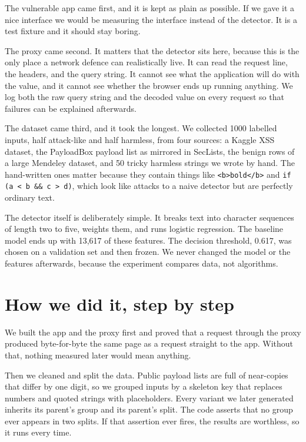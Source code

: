 \documentclass[11pt,a4paper]{article}
\newcommand{\tc}[1]{\texttt{\small #1}}
\begin{document}
The vulnerable app came first, and it is kept as plain as possible. If we gave it a nice
interface we would be measuring the interface instead of the detector. It is a test fixture
and it should stay boring.

The proxy came second. It matters that the detector sits here, because this is the only
place a network defence can realistically live. It can read the request line, the headers,
and the query string. It cannot see what the application will do with the value, and it
cannot see whether the browser ends up running anything. We log both the raw query string
and the decoded value on every request so that failures can be explained afterwards.

The dataset came third, and it took the longest. We collected 1000 labelled inputs, half
attack-like and half harmless, from four sources: a Kaggle XSS dataset, the PayloadBox
payload list as mirrored in SecLists, the benign rows of a large Mendeley dataset, and 50
tricky harmless strings we wrote by hand. The hand-written ones matter because they contain
things like \tc{<b>bold</b>} and \tc{if (a < b \&\& c > d)}, which look like attacks to a
naive detector but are perfectly ordinary text.

The detector itself is deliberately simple. It breaks text into character sequences of
length two to five, weights them, and runs logistic regression. The baseline model ends up
with 13{,}617 of these features. The decision threshold, 0.617, was chosen on a validation
set and then frozen. We never changed the model or the features afterwards, because the
experiment compares data, not algorithms.

\section{How we did it, step by step}

We built the app and the proxy first and proved that a request through the proxy produced
byte-for-byte the same page as a request straight to the app. Without that, nothing
measured later would mean anything.

Then we cleaned and split the data. Public payload lists are full of near-copies that
differ by one digit, so we grouped inputs by a skeleton key that replaces numbers and
quoted strings with placeholders. Every variant we later generated inherits its parent's
group and its parent's split. The code asserts that no group ever appears in two splits. If
that assertion ever fires, the results are worthless, so it runs every time.
\end{document}
